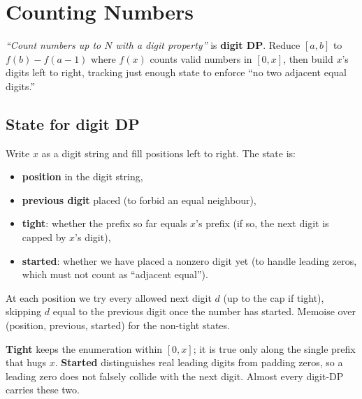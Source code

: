 \section{Counting Numbers}
\label{sec:cses-counting-numbers}


\begin{patternbox}
\emph{``Count numbers up to $N$ with a digit property''} is
\textbf{digit DP}. Reduce $[a,b]$ to $f(b)-f(a-1)$ where $f(x)$ counts
valid numbers in $[0,x]$, then build $x$'s digits left to right, tracking
just enough state to enforce ``no two adjacent equal digits.''
\end{patternbox}

\subsection*{State for digit DP}

Write $x$ as a digit string and fill positions left to right. The state
is:
\begin{itemize}
  \item \textbf{position} in the digit string,
  \item \textbf{previous digit} placed (to forbid an equal neighbour),
  \item \textbf{tight}: whether the prefix so far equals $x$'s prefix (if
        so, the next digit is capped by $x$'s digit),
  \item \textbf{started}: whether we have placed a nonzero digit yet (to
        handle leading zeros, which must not count as ``adjacent equal'').
\end{itemize}
At each position we try every allowed next digit $d$ (up to the cap if
tight), skipping $d$ equal to the previous digit once the number has
started. Memoise over (position, previous, started) for the non-tight
states.

\begin{ideabox}
\textbf{Tight} keeps the enumeration within $[0,x]$; it is true only along
the single prefix that hugs $x$. \textbf{Started} distinguishes real
leading digits from padding zeros, so a leading zero does not falsely
collide with the next digit. Almost every digit-DP carries these two.
\end{ideabox}

